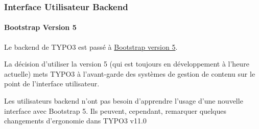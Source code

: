%

\begin{frame}[fragile]
	\frametitle{Interface Utilisateur Backend}
	\framesubtitle{Bootstrap Version 5}

	Le backend de TYPO3 est passé à
	\href{https://getbootstrap.com/}{Bootstrap version 5}.

	\vspace{0.2cm}

	La décision d'utiliser la version 5 (qui est toujours en développement à
	l'heure actuelle) mets TYPO3 à l'avant-garde des systèmes de gestion de
	contenu sur le point de l'interface utilisateur.

	\vspace{0.2cm}

	Les utilisateurs backend n'ont pas besoin d'apprendre l'usage d'une
	nouvelle interface avec Bootstrap 5. Ils peuvent, cependant, remarquer
	quelques changements d'ergonomie dans TYPO3 v11.0

\end{frame}


